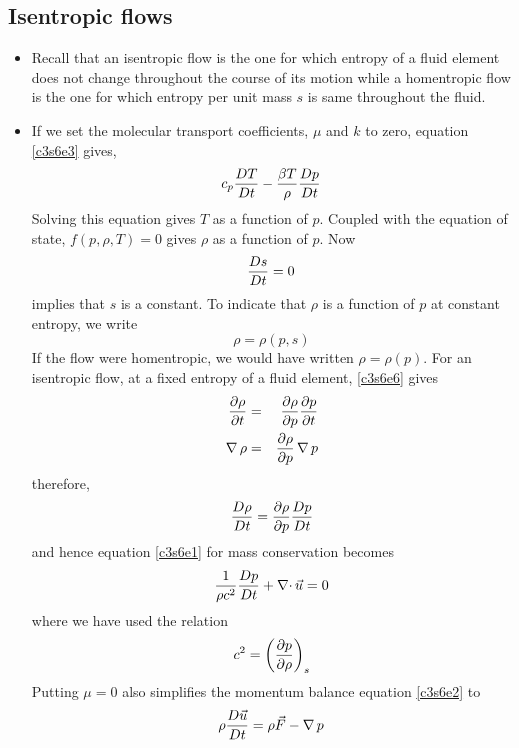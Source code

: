 \subsection{Isentropic flows}
\begin{itemize}
\item Recall that an isentropic flow is the one for which entropy of a fluid element does not change throughout the course of its motion while a homentropic flow is the one for which 
entropy per unit mass $s$ is same throughout the fluid.

\item If we set the molecular transport coefficients, $\mu$ and $k$ to zero, equation \eqref{c3s6e3} gives,
\begin{equation}\label{c3s6e5}
c_p\frac{D{T}}{Dt} - \frac{\beta T}{\rho}\frac{D{p}}{Dt}
\end{equation}
Solving this equation gives $T$ as a function of $p$. Coupled with the equation of state, $f(p, \rho, T) = 0$ gives $\rho$ as a function of $p$. Now 
\[
\frac{D{s}}{Dt} = 0
\]
implies that $s$ is a constant. To indicate that $\rho$ is a function of $p$ at constant entropy, we write
\begin{equation}\label{c3s6e6}
\rho = \rho(p, s)
\end{equation}
If the flow were homentropic, we would have written $\rho = \rho(p)$. For an isentropic flow, at a fixed entropy of a fluid element, \eqref{c3s6e6} gives
\begin{eqnarray*}
\frac{\partial{\rho}}{\partial{t}} &=& \frac{\partial{\rho}}{\partial{p}}\frac{\partial{p}}{\partial{t}} \\
\operatorname{\nabla}{\rho} &=& \frac{\partial{\rho}}{\partial{p}}\operatorname{\nabla} p
\end{eqnarray*}
therefore,
\begin{equation}\label{c3s6e7}
\frac{D{\rho}}{Dt} = \frac{\partial{\rho}}{\partial{p}}\frac{D{p}}{Dt}
\end{equation}
and hence equation \eqref{c3s6e1} for mass conservation becomes
\begin{equation}\label{c3s6e8}
\frac{1}{\rho c^2}\frac{D{p}}{Dt} + \operatorname{\nabla\cdot}\vec{u} = 0
\end{equation}
where we have used the relation
\begin{equation}\label{c3s6e9}
c^2 = \left(\frac{\partial{p}}{\partial{\rho}}\right)_s
\end{equation}
Putting $\mu = 0$ also simplifies the momentum balance equation \eqref{c3s6e2} to
\begin{equation}\label{c3s6e10}
\rho\frac{D{\vec{u}}}{Dt} = \rho\vec{F} - \operatorname{\nabla} p
\end{equation}


\end{itemize}
